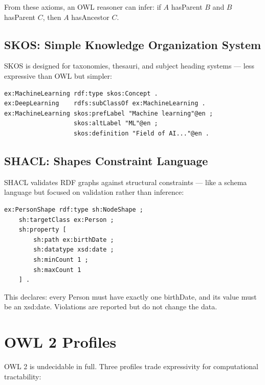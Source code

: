 \documentclass[11pt,a4paper,oneside,openany]{book}
\theoremstyle{definition}
\theoremstyle{plain}
\theoremstyle{remark}
\begin{document}
From these axioms, an OWL reasoner can infer: if $A$ hasParent $B$ and $B$ hasParent $C$, then $A$ hasAncestor $C$.

\subsection{SKOS: Simple Knowledge Organization System}

SKOS is designed for taxonomies, thesauri, and subject heading systems --- less expressive than OWL but simpler:

\begin{lstlisting}[language=XML,numbers=none]
ex:MachineLearning rdf:type skos:Concept .
ex:DeepLearning    rdfs:subClassOf ex:MachineLearning .
ex:MachineLearning skos:prefLabel "Machine learning"@en ;
                   skos:altLabel "ML"@en ;
                   skos:definition "Field of AI..."@en .
\end{lstlisting}

\subsection{SHACL: Shapes Constraint Language}

SHACL validates RDF graphs against structural constraints --- like a schema language but focused on validation rather than inference:

\begin{lstlisting}[language=XML,numbers=none]
ex:PersonShape rdf:type sh:NodeShape ;
    sh:targetClass ex:Person ;
    sh:property [
        sh:path ex:birthDate ;
        sh:datatype xsd:date ;
        sh:minCount 1 ;
        sh:maxCount 1
    ] .
\end{lstlisting}

This declares: every Person must have exactly one birthDate, and its value must be an xsd:date. Violations are reported but do not change the data.

\section{OWL 2 Profiles}\label{sec:owl-profiles}

OWL 2 is undecidable in full. Three profiles trade expressivity for computational tractability:
\end{document}
